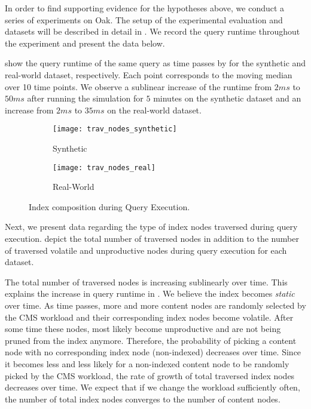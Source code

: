 \documentclass[abstracton,12pt]{scrartcl}
\theoremstyle{definition}
\begin{document}
In order to find supporting evidence for the hypotheses above, we conduct a series of
experiments on Oak. The setup of the  experimental evaluation and
datasets will be described in detail in . We
record the query runtime throughout the experiment and present the data below.

 show the 
query runtime of the same query as time passes by for the synthetic and
real-world dataset, respectively. 
Each point corresponds to the moving median over 10 time points.
We observe a sublinear increase of the runtime from $2 ms$ to $50 ms$
after running the simulation for $5$ minutes
on the synthetic dataset and an increase from $2 ms$ to $35 ms$ on the
real-world dataset. 

\begin{figure}[!ht]
  \centering
  \begin{subfigure}{0.49\linewidth}
    \centering
    \caption{Synthetic}
    \texttt{[image: trav\_nodes\_synthetic]}
    \label{fig:trav_nodes_synthetic}
  \end{subfigure}
  \begin{subfigure}{0.49\linewidth}
    \centering
    \caption{Real-World}
    \texttt{[image: trav\_nodes\_real]}
    \label{fig:trav_nodes_real}
  \end{subfigure}
  \vspace{-0.5cm}
  \caption{Index composition during Query Execution.}
  \label{fig:trav_nodes}
\end{figure}

Next, we present data regarding the type of index nodes traversed during query
execution.
 depict
the total number of traversed nodes in addition to the number of traversed
volatile and unproductive nodes during query execution for each dataset.

The total number of traversed nodes is increasing sublinearly over time. This
explains the increase in query runtime in
.
We believe the index becomes \textit{static} over time.
As time passes, more and more content nodes are randomly
selected by the CMS workload and their corresponding index nodes become
volatile. After some time these nodes, most likely become unproductive and are
not  being pruned from the index anymore.
Therefore, the probability of picking a content node with no corresponding index
node (non-indexed)
decreases over time. Since it becomes less and less likely for a non-indexed content node
to be randomly picked by the CMS workload, the rate of growth of total traversed
index nodes decreases over time. We expect that if we change the workload
sufficiently often, the number of total index nodes converges to the number of
content nodes.
\end{document}

